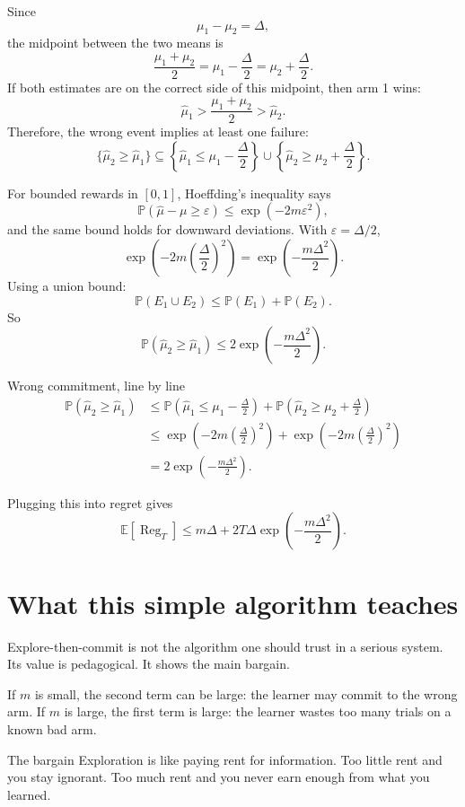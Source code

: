 \documentclass[en,nofont,11pt]{elegantbook}
\newcommand{\E}{\mathbb{E}}
\newcommand{\Pp}{\mathbb{P}}
\providecommand{\Reg}{\operatorname{Reg}}
\begin{document}
Since
\[
\mu_1-\mu_2=\Delta,
\]
the midpoint between the two means is
\[
\frac{\mu_1+\mu_2}{2}=\mu_1-\frac{\Delta}{2}=\mu_2+\frac{\Delta}{2}.
\]
If both estimates are on the correct side of this midpoint, then arm 1 wins:
\[
\widehat\mu_1>\frac{\mu_1+\mu_2}{2}>\widehat\mu_2.
\]
Therefore, the wrong event implies at least one failure:
\[
\{\widehat\mu_2\geq\widehat\mu_1\}
\subseteq
\left\{\widehat\mu_1\leq \mu_1-\frac{\Delta}{2}\right\}
\cup
\left\{\widehat\mu_2\geq \mu_2+\frac{\Delta}{2}\right\}.
\]

For bounded rewards in $[0,1]$, Hoeffding's inequality says
\[
\Pp(\widehat\mu-\mu\geq \varepsilon)
\leq
\exp(-2m\varepsilon^2),
\]
and the same bound holds for downward deviations. With $\varepsilon=\Delta/2$,
\[
\exp\left(-2m\left(\frac{\Delta}{2}\right)^2\right)
=
\exp\left(-\frac{m\Delta^2}{2}\right).
\]
Using a union bound:
\[
\Pp(E_1\cup E_2)\leq \Pp(E_1)+\Pp(E_2).
\]
So
\[
\Pp(\widehat\mu_2\geq \widehat\mu_1)
\leq
2\exp\left(-\frac{m\Delta^2}{2}\right).
\]

\begin{proofbox}{Wrong commitment, line by line}
\[
\begin{aligned}
\Pp(\widehat\mu_2\geq\widehat\mu_1)
&\leq
\Pp\left(\widehat\mu_1\leq \mu_1-\frac{\Delta}{2}\right)
+
\Pp\left(\widehat\mu_2\geq \mu_2+\frac{\Delta}{2}\right)\\
&\leq
\exp\left(-2m\left(\frac{\Delta}{2}\right)^2\right)
+
\exp\left(-2m\left(\frac{\Delta}{2}\right)^2\right)\\
&=
2\exp\left(-\frac{m\Delta^2}{2}\right).
\end{aligned}
\]
\end{proofbox}

Plugging this into regret gives
\[
\E[\Reg_T]
\leq
m\Delta+2T\Delta\exp\left(-\frac{m\Delta^2}{2}\right).
\]

\section{What this simple algorithm teaches}

Explore-then-commit is not the algorithm one should trust in a serious system. Its value is pedagogical. It shows the main bargain.

If $m$ is small, the second term can be large: the learner may commit to the wrong arm. If $m$ is large, the first term is large: the learner wastes too many trials on a known bad arm.

\begin{plainbox}{The bargain}
Exploration is like paying rent for information. Too little rent and you stay ignorant. Too much rent and you never earn enough from what you learned.
\end{plainbox}
\end{document}
